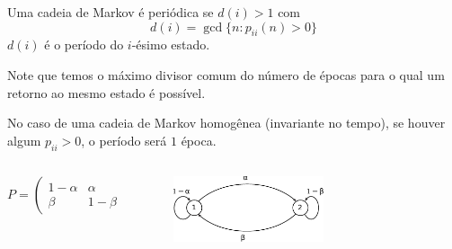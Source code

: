 \begin{frame}[allowframebreaks]
   \framebreak

   \begin{definition}[Período]
   Uma cadeia de Markov é periódica se $d(i) > 1$ com
	\begin{equation}
	d(i) = \gcd \{ n : p_{ii}(n) > 0 \}
	\end{equation}
   $d(i)$ é o período do $i$-ésimo estado.
   \end{definition}
   Note que temos o máximo divisor comum do número de épocas para o qual um retorno ao mesmo estado é possível.


   No caso de uma cadeia de Markov homogênea (invariante no tempo), se houver algum $p_{ii} > 0$, 
   o período será $1$ época.

   \framebreak

   \begin{example}
     \begin{columns}
     \begin{column}{0.5\textwidth}
	\begin{equation}
	P = \begin{pmatrix} 1 - \alpha & \alpha \\ \beta & 1 - \beta \end{pmatrix}
	\end{equation}
     \end{column}
     \begin{column}{0.5\textwidth}
        \begin{figure}[h!]
        \centering
        \includegraphics[width=0.6\textwidth]{images/markov-example2.pdf}
        \label{fig:markov-example2}
        \end{figure}
     \end{column}
     \end{columns}


\end{example}
\end{frame}
